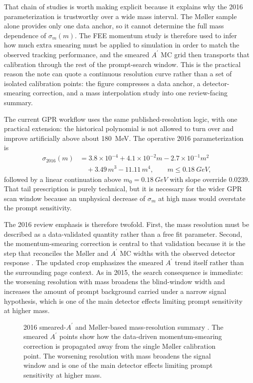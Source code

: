 That chain of studies is worth making explicit because it explains why the 2016
parameterization is trustworthy over a wide mass interval. The M{\o}ller sample alone
provides only one data anchor, so it cannot determine the full mass dependence of
$\sigma_m(m)$. The FEE momentum study is therefore used to infer how much extra
smearing must be applied to simulation in order to match the observed tracking
performance, and the smeared $A^\prime$ MC grid then transports that calibration
through the rest of the prompt-search window. This is the practical reason the note can
quote a continuous resolution curve rather than a set of isolated calibration points:
the figure compresses a data anchor, a detector-smearing correction, and a mass
interpolation study into one review-facing summary.

The current GPR workflow uses the same published-resolution logic, with one practical
extension: the historical polynomial is not allowed to turn over and improve
artificially above about \SI{180}{MeV}. The operative 2016 parameterization is
\begin{align}
\sigma_{2016}(m) &= 3.8\times10^{-4} + 4.1\times10^{-2}m - 2.7\times10^{-1}m^2 \nonumber\\
&\quad + 3.49\,m^3 - 11.11\,m^4,
\qquad m \le \SI{0.18}{GeV},
\label{eq:sigma2016}
\end{align}
followed by a linear continuation above $m_0=\SI{0.18}{GeV}$ with slope override
\num{0.0239}. That tail prescription is purely technical, but it is necessary for the
wider GPR scan window because an unphysical decrease of $\sigma_m$ at high mass would
overstate the prompt sensitivity.

The 2016 review emphasis is therefore twofold. First, the mass resolution must be
described as a data-validated quantity rather than a free fit parameter. Second, the
momentum-smearing correction is central to that validation because it is the step that
reconciles the M{\o}ller and $A^\prime$ MC widths with the observed detector response
\cite{HPS2016BumpInternal,HPS2016PromptLong}. The updated crop emphasizes the smeared
$A^\prime$ trend itself rather than the surrounding page context. As in 2015, the
search consequence is immediate: the worsening resolution with mass broadens the
blind-window width and increases the amount of prompt background carried under a narrow
signal hypothesis, which is one of the main detector effects limiting prompt
sensitivity at higher mass.

\begin{figure}[H]
\centering
{}
\caption{2016 smeared-$A^\prime$ and M{\o}ller-based mass-resolution summary
\cite{HPS2016BumpInternal}. The smeared $A^\prime$ points show how the data-driven
momentum-smearing correction is propagated away from the single M{\o}ller calibration
point. The worsening resolution with mass broadens the signal window and is one of the
main detector effects limiting prompt sensitivity at higher mass.}
\label{fig:2016-resolution}
\end{figure}


